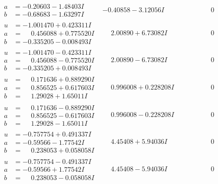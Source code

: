 \documentclass[1p]{elsarticle_modified}
\theoremstyle{definition}
\begin{document}
$$\begin{array}{c|c|c}
\begin{aligned}
a &= -0.20603 - 1.48403 I \\
b &= -0.68683 - 1.63297 I\end{aligned}
 & -0.40858 - 3.12056 I & \phantom{-0.000000 } 0 \\ \hline\begin{aligned}
u &= -1.001470 + 0.423311 I \\
a &= \phantom{-}0.456088 + 0.775520 I \\
b &= -0.335205 - 0.008493 I\end{aligned}
 & \phantom{-}2.00890 + 6.73082 I & \phantom{-0.000000 } 0 \\ \hline\begin{aligned}
u &= -1.001470 - 0.423311 I \\
a &= \phantom{-}0.456088 - 0.775520 I \\
b &= -0.335205 + 0.008493 I\end{aligned}
 & \phantom{-}2.00890 - 6.73082 I & \phantom{-0.000000 } 0 \\ \hline\begin{aligned}
u &= \phantom{-}0.171636 + 0.889290 I \\
a &= \phantom{-}0.856525 + 0.617603 I \\
b &= \phantom{-}1.29028 + 1.65011 I\end{aligned}
 & \phantom{-}0.996008 + 0.228208 I & \phantom{-0.000000 } 0 \\ \hline\begin{aligned}
u &= \phantom{-}0.171636 - 0.889290 I \\
a &= \phantom{-}0.856525 - 0.617603 I \\
b &= \phantom{-}1.29028 - 1.65011 I\end{aligned}
 & \phantom{-}0.996008 - 0.228208 I & \phantom{-0.000000 } 0 \\ \hline\begin{aligned}
u &= -0.757754 + 0.491337 I \\
a &= -0.59566 - 1.77542 I \\
b &= \phantom{-}0.238053 + 0.058058 I\end{aligned}
 & \phantom{-}4.45408 + 5.94036 I & \phantom{-0.000000 } 0 \\ \hline\begin{aligned}
u &= -0.757754 - 0.491337 I \\
a &= -0.59566 + 1.77542 I \\
b &= \phantom{-}0.238053 - 0.058058 I\end{aligned}
 & \phantom{-}4.45408 - 5.94036 I & \phantom{-0.000000 } 0\\

\end{array}$$
\end{document}
